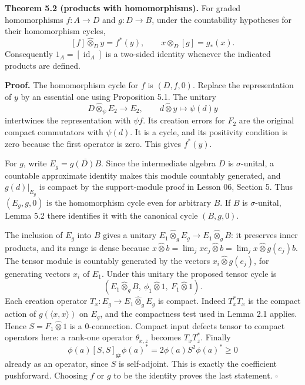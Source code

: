 \documentclass[
  11pt,
]{article}
\begin{document}
\textbf{Theorem 5.2 (products with homomorphisms).} For graded
homomorphisms \(f:A\to D\) and \(g:D\to B\), under the countability
hypotheses for their homomorphism cycles, \[
[f]\widehat\otimes_D y=f^*(y),\qquad
x\widehat\otimes_D[g]=g_*(x).
\tag{5.2}
\] Consequently \(1_A=[\operatorname{id}_A]\) is a two-sided identity
whenever the indicated products are defined.

\textbf{Proof.} The homomorphism cycle for \(f\) is \((D,f,0)\). Replace
the representation of \(y\) by an essential one using Proposition 5.1.
The unitary \[
D\widehat\otimes_\psi E_2\longrightarrow E_2,\qquad
d\widehat\otimes y\longmapsto\psi(d)y
\tag{5.3}
\] intertwines the representation with \(\psi f\). Its creation errors
for \(F_2\) are the original compact commutators with \(\psi(d)\). It is
a cycle, and its positivity condition is zero because the first operator
is zero. This gives \(f^*(y)\).

For \(g\), write \(E_g=\overline{g(D)B}\). Since the intermediate
algebra \(D\) is \(\sigma\)-unital, a countable approximate identity
makes this module countably generated, and \(g(d)|_{E_g}\) is compact by
the support-module proof in Lesson 06, Section 5. Thus \((E_g,g,0)\) is
the homomorphism cycle even for arbitrary \(B\). If \(B\) is
\(\sigma\)-unital, Lemma 5.2 there identifies it with the canonical
cycle \((B,g,0)\).

The inclusion of \(E_g\) into \(B\) gives a unitary
\(E_1\widehat\otimes_gE_g\to E_1\widehat\otimes_gB\): it preserves inner
products, and its range is dense because
\(x\widehat\otimes b=\lim_j xe_j\widehat\otimes b=\lim_jx\widehat\otimes g(e_j)b\).
The tensor module is countably generated by the vectors
\(x_i\widehat\otimes g(e_j)\), for generating vectors \(x_i\) of
\(E_1\). Under this unitary the proposed tensor cycle is \[
(E_1\widehat\otimes_g B,\ \phi_1\widehat\otimes1,\
F_1\widehat\otimes1).
\] Each creation operator \(T_x:E_g\to E_1\widehat\otimes_g E_g\) is
compact. Indeed \(T_x^*T_x\) is the compact action of
\(g(\langle x,x\rangle)\) on \(E_g\), and the compactness test used in
Lemma 2.1 applies. Hence \(S=F_1\widehat\otimes1\) is a
\(0\)-connection. Compact input defects tensor to compact operators
here: a rank-one operator \(\theta_{x,z}\) becomes \(T_xT_z^*\). Finally
\[
\phi(a)[S,S]_{\mathrm{gr}}\phi(a)^*
=2\phi(a)S^2\phi(a)^*\geq0
\] already as an operator, since \(S\) is self-adjoint. This is exactly
the coefficient pushforward. Choosing \(f\) or \(g\) to be the identity
proves the last statement. \(\square\)
\end{document}
